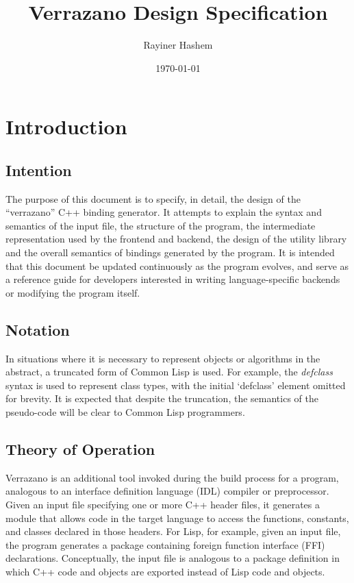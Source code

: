 \documentclass[12pt]{article}
\begin{document}
\title{Verrazano Design Specification}
\author{Rayiner Hashem}
\date{\today}
\maketitle

\section{Introduction}

\subsection{Intention}
The purpose of this document is to specify, in detail, the design of the ``verrazano'' C++ binding generator. It attempts to explain the syntax and semantics of the input file, the structure of the program, the intermediate representation used by the frontend and backend, the design of the utility library and the overall semantics of bindings generated by the program. It is intended that this document be updated continuously as the program evolves, and serve as a reference guide for developers interested in writing language-specific backends or modifying the program itself. 

\subsection{Notation}
In situations where it is necessary to represent objects or algorithms in the abstract, a truncated form of Common Lisp is used. For example, the \emph{defclass} syntax is used to represent class types, with the initial `defclass' element omitted for brevity. It is expected that despite the truncation, the semantics of the pseudo-code will be clear to Common Lisp programmers. 

\subsection{Theory of Operation}
Verrazano is an additional tool invoked during the build process for a program, analogous to an interface definition language (IDL) compiler or preprocessor. Given an input file specifying one or more C++ header files, it generates a module that allows code in the target language to access the functions, constants, and classes declared in those headers. For Lisp, for example, given an input file, the program generates a package containing foreign function interface (FFI) declarations. Conceptually, the input file is analogous to a package definition in which C++ code and objects are exported instead of Lisp code and objects.
\end{document}
